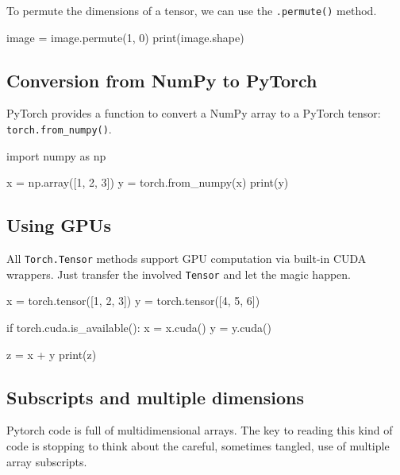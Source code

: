 To permute the dimensions of a tensor, we can use the \texttt{.permute()} method.
\begin{codeblock}[language=python]
image = image.permute(1, 0)
print(image.shape)
\end{codeblock}

\subsection{Conversion from NumPy to PyTorch}

PyTorch provides a function to convert a NumPy array to a PyTorch tensor: \texttt{torch.from\_numpy()}.
\begin{codeblock}[language=python]
import numpy as np

x = np.array([1, 2, 3])
y = torch.from_numpy(x)
print(y)
\end{codeblock}

\subsection{Using GPUs}

All \texttt{Torch.Tensor} methods support GPU computation via built-in CUDA wrappers. Just transfer the involved \texttt{Tensor} and let the magic happen.

\begin{codeblock}[language=python]
x = torch.tensor([1, 2, 3])
y = torch.tensor([4, 5, 6])

if torch.cuda.is_available():
    x = x.cuda()
    y = y.cuda()

    z = x + y
    print(z)
\end{codeblock}

\subsection{Subscripts and multiple dimensions}

Pytorch code is full of multidimensional arrays.  The key to reading this kind of code is stopping to think about the careful, sometimes tangled, use of multiple array subscripts.


